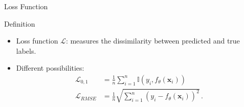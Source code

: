 \begin{frame}{Loss Function}
    \begin{definitionblock}{Definition}
        \centering
        \begin{itemize}
            \item<1-> Loss function $\mathcal{L}$: measures the dissimilarity between predicted and true labels.
            \item<2-> Different possibilities:
            \begin{align*}
                \mathcal{L}_{0, 1} &= \frac{1}{n} \sum_{i=1}^{n} \mathbb{I}(y_i, f_{\theta}(\mathbf{x}_i))\\
                \mathcal{L}_{RMSE} &= \frac{1}{n}\sqrt{\sum_{i=1}^{n} {(y_i-f_{\theta}(\mathbf{x}_i))}^2}\,.
            \end{align*}
        \end{itemize}
    \end{definitionblock}
\end{frame}

